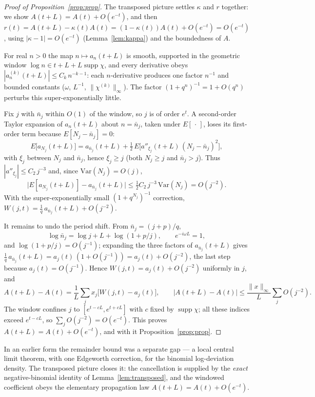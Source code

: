 \documentclass[11pt]{article}
\theoremstyle{definition}
\begin{document}
\begin{proof}[Proof of Proposition~\ref{prop:prop}]
  The transposed picture settles $\kappa$ and $r$ together: we show
  $A(t+L)=A(t)+O(e^{-t})$, and then
  $r(t)=A(t+L)-\kappa(t)A(t)=(1-\kappa(t))A(t)+O(e^{-t})=O(e^{-t})$,
  using $|\kappa-1|=O(e^{-t})$ (Lemma~\ref{lem:kappa}) and the
  boundedness of $A$.

  For real $n>0$ the map $n\mapsto a_n(t+L)$ is smooth, supported in
  the geometric window $\log n\in t+L+L\operatorname{supp}\chi$, and
  every derivative obeys $|a_n^{(k)}(t+L)|\le C_k\,n^{-k-1}$: each
  $n$-derivative produces one factor $n^{-1}$ and bounded constants
  ($\omega$, $L^{-1}$, $\|\chi^{(k)}\|_\infty$). The factor
  $(1+q^n)^{-1}=1+O(q^n)$ perturbs this super-exponentially little.

  Fix $j$ with $\bar n_j$ within $O(1)$ of the window, so $j$ is of
  order $e^{t}$. A second-order Taylor expansion of $a_n(t+L)$ about
  $n=\bar n_j$, taken under $E[\,\cdot\,]$, loses its first-order term
  because $E[N_j-\bar n_j]=0$:
  \[
    E\bigl[a_{N_j}(t+L)\bigr]=a_{\bar n_j}(t+L)
      +\tfrac12\,E\bigl[a''_{\xi_j}(t+L)\,(N_j-\bar n_j)^2\bigr],
  \]
  with $\xi_j$ between $N_j$ and $\bar n_j$, hence $\xi_j\ge j$ (both
  $N_j\ge j$ and $\bar n_j>j$). Thus $|a''_{\xi_j}|\le C_2\,j^{-3}$
  and, since $\mathrm{Var}(N_j)=O(j)$,
  \[
    \bigl|E[a_{N_j}(t+L)]-a_{\bar n_j}(t+L)\bigr|
      \le\tfrac12 C_2\,j^{-3}\,\mathrm{Var}(N_j)=O(j^{-2}).
  \]
  With the super-exponentially small $(1+q^{N_j})^{-1}$ correction,
  $W(j,t)=\tfrac1q\,a_{\bar n_j}(t+L)+O(j^{-2})$.

  It remains to undo the period shift. From $\bar n_j=(j+p)/q$,
  \[
    \log\bar n_j=\log j+L+\log(1+p/j),\qquad e^{-i\omega L}=1 ,
  \]
  and $\log(1+p/j)=O(j^{-1})$; expanding the three factors of
  $a_{\bar n_j}(t+L)$ gives
  $\tfrac1q\,a_{\bar n_j}(t+L)=a_j(t)\,(1+O(j^{-1}))=a_j(t)+O(j^{-2})$,
  the last step because $a_j(t)=O(j^{-1})$. Hence
  $W(j,t)=a_j(t)+O(j^{-2})$ uniformly in $j$, and
  \[
    A(t+L)-A(t)=\frac1L\sum_j x_j\bigl[W(j,t)-a_j(t)\bigr],
    \qquad
    |A(t+L)-A(t)|\le\frac{\|x\|_\infty}{L}\sum_j O(j^{-2}).
  \]
  The window confines $j$ to $[e^{t-cL},e^{t+cL}]$ with $c$ fixed by
  $\operatorname{supp}\chi$; all these indices exceed $e^{t-cL}$, so
  $\sum_j O(j^{-2})=O(e^{-t})$. This proves $A(t+L)=A(t)+O(e^{-t})$,
  and with it Proposition~\ref{prop:prop}.
\end{proof}

\noindent In an earlier form the remainder bound was a separate gap
--- a local central limit theorem, with one Edgeworth correction, for
the binomial log-deviation density. The transposed picture closes it:
the cancellation is supplied by the \emph{exact} negative-binomial
identity of Lemma~\ref{lem:transposed}, and the windowed coefficient
obeys the elementary propagation law $A(t+L)=A(t)+O(e^{-t})$.
\end{document}
